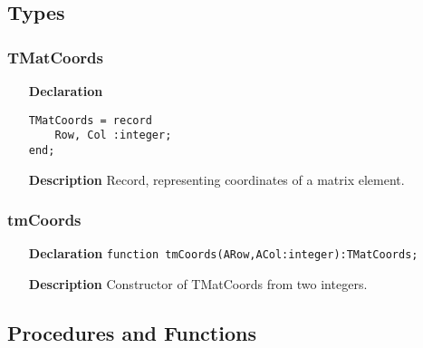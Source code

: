 \documentclass[12pt,a4paper,oneside]{report}
\newcommand{\declarationitem}[1]{\textbf{#1}}
\newcommand{\descriptiontitle}[1]{\textbf{#1}}
\newcommand{\code}[1]{\texttt{#1}}
\begin{document}
\subsection{Types}
\subsubsection{TMatCoords}
\begin{itemize}
	\item[\declarationitem{Declaration}\hfill]
\begin{verbatim}
TMatCoords = record
	Row, Col :integer;
end;
\end{verbatim}
\item[\descriptiontitle{Description}]
Record, representing coordinates of a matrix element.
\end{itemize}
\subsubsection{tmCoords}
\begin{itemize}\label{uvecutils:tmcoords}
\item[\declarationitem{Declaration}\hfill]
\code{function tmCoords(ARow,ACol:integer):TMatCoords;}
\item[\descriptiontitle{Description}]
Constructor of TMatCoords from two integers.
\end{itemize}
\subsection{Procedures and Functions}
\end{document}
